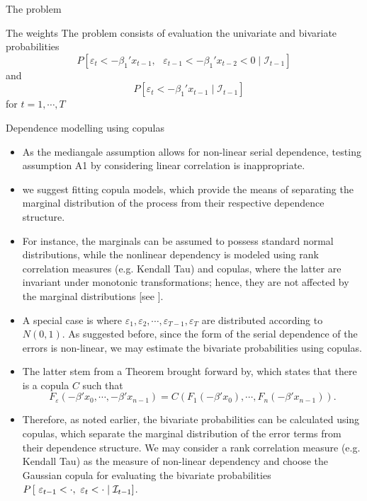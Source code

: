 \documentclass{beamer}
\begin{document}
\begin{frame}{The problem}
\begin{block}{The weights}
The problem consists of evaluation the univariate and bivariate probabilities
\[
P\left[ \varepsilon_{t}<-\beta_1'x_{t-1},\text{ }%
\varepsilon_{t-1}<-\beta_1'x_{t-2}<0\mid\mathcal{I}_{t-1} \right]
\]
and
\[
\quad P\left[ \varepsilon_{t}<-\beta_1'x_{t-1}\mid\mathcal{I}_{t-1}\right]
\]
for $t=1,\cdots,T$
\end{block}
\end{frame}
\begin{frame}{Dependence modelling using copulas}
\begin{itemize}
\item {} As the mediangale assumption allows for non-linear serial dependence, testing assumption A1 by considering linear correlation is inappropriate. 

\item{} we suggest fitting copula models, which provide the means of separating the marginal distribution of the process from their respective dependence structure.
\item{} For instance, the marginals can be assumed to possess standard normal distributions, while the nonlinear dependency is modeled using rank correlation measures (e.g. Kendall Tau) and copulas, where the latter are invariant under monotonic transformations; hence, they are not affected by the marginal distributions [see ].
\end{itemize}
\end{frame}

\begin{frame}
\begin{itemize}
\item{}A special case is where $\varepsilon_1,\varepsilon_2,\cdots,\varepsilon_{T-1},\varepsilon_T$ are distributed according to $N(0,1)$. As suggested before, since the form of the serial dependence of the errors is non-linear, we may estimate the bivariate probabilities using copulas. 

\item{}The latter stem from a Theorem brought forward by, which states that there is a copula $C$ such that
\[
F_{\varepsilon}(-\beta' x_0,\cdots,-\beta' x_{n-1})=C(F_1(-\beta' x_0),\cdots,F_n(-\beta' x_{n-1})).
\]
\item{}Therefore, as noted earlier, the bivariate probabilities can be calculated using copulas, which separate the marginal distribution of the error terms from their dependence structure. We may consider a rank correlation measure (e.g. Kendall Tau) as the measure of non-linear dependency and choose the Gaussian copula for evaluating the bivariate probabilities $P\left[ \text{ }\varepsilon_{t-1}<\cdot ,\-
\text{ }\varepsilon_{t}<\cdot \mid \mathcal{I}_{t-1}\right]$.
\end{itemize}
\end{frame}
\end{document}
